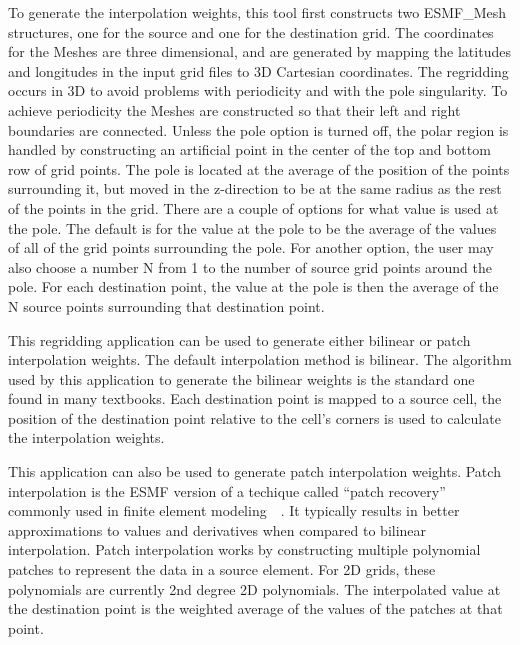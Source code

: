  To generate the interpolation weights, this tool first constructs two ESMF\_Mesh 
structures, one for the source and one for the destination grid. 
The coordinates for the Meshes are three dimensional, and are generated by mapping 
the latitudes and longitudes in the input grid files to 
3D Cartesian coordinates. The regridding occurs in 3D to avoid
problems with periodicity and with the pole singularity. To achieve periodicity 
the Meshes are constructed so that their left and right boundaries are connected. 
Unless the pole option is turned off, the polar region is handled by constructing 
an artificial point in the center of the top and bottom row of grid points. 
The pole is located at the average of the position of the points surrounding
it, but moved in the z-direction to be at the same radius as the rest of the points
in the grid. There are a couple of options for what value is used at the pole. 
The default is for the value at the pole to be the average of the values
of all of the grid points surrounding the pole. For another option, the user may also choose
a number N from 1 to the number of source grid points around the pole. For
each destination point, the value at the pole is then the average of the N source points
surrounding that destination point.

 This regridding application can be used to generate either bilinear or patch interpolation weights. The default interpolation method
is bilinear. The algorithm used by this application to generate the bilinear weights is the standard one found in
many textbooks.  Each destination point is mapped to a source cell, the position of the destination point relative to the cell's 
corners is used to calculate the interpolation weights. 

 This application can also be used to generate patch interpolation weights. Patch
interpolation is the ESMF version of a techique called ``patch recovery'' commonly
used in finite element modeling~\cite{PatchInterp1}~\cite{PatchInterp2}. It typically results in better approximations to values and derivatives when compared to bilinear interpolation.  
Patch interpolation works by constructing multiple polynomial patches to represent
the data in a source element. For 2D grids, these polynomials 
are currently 2nd degree 2D polynomials. The interpolated value at the destination point 
is the weighted average of the values of the patches at that point. 

